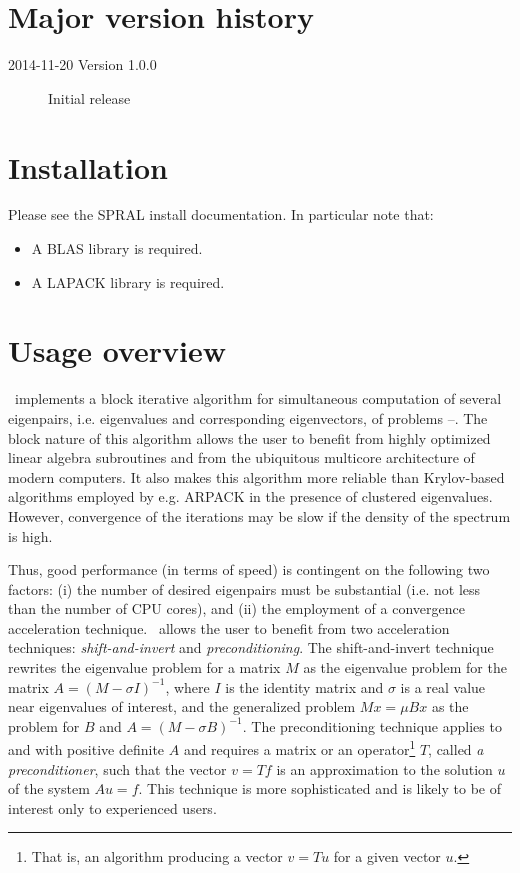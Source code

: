 \section*{Major version history}
\begin{description}
\item[2014-11-20 Version 1.0.0] Initial release
\end{description}


\section{Installation}
Please see the SPRAL install documentation. In particular note that:
\begin{itemize}
   \item A BLAS library is required.
   \item A LAPACK library is required.
\end{itemize}

\section{Usage overview}

\label{sec:summary}

\fullpackagename\
implements a block iterative algorithm
for simultaneous computation of several eigenpairs,
i.e. eigenvalues and corresponding eigenvectors,
of problems --.
The block nature of this algorithm allows the user
to benefit from highly optimized linear algebra subroutines
and from the ubiquitous multicore architecture
of modern computers.
It also makes this algorithm more reliable
than Krylov-based algorithms employed by e.g. ARPACK
in the presence of clustered eigenvalues.
However, convergence of the iterations may be slow
if the density of the spectrum is high.

Thus, good performance 
(in terms of speed)
is contingent on the following two factors:
(i) the number of desired
eigenpairs must be substantial
(i.e. not less than the number of CPU cores),
and
(ii) the employment of a convergence acceleration technique.
\fullpackagename\ allows the user to benefit
from two acceleration techniques:
{\em shift-and-invert} and {\em preconditioning}.
The shift-and-invert technique 
rewrites the eigenvalue problem for a matrix $M$ 
as the eigenvalue problem  for the matrix
$A = (M - \sigma I)^{-1}$,
where $I$ is the identity matrix
and $\sigma$ is a real value near eigenvalues of interest,
and the generalized problem $M x = \mu B x$
as the problem 
for $B$ and 
$A = (M - \sigma B)^{-1}$. 
The preconditioning technique applies to 
 and  with positive definite $A$ and
requires a matrix or an operator\footnote{
That is, an algorithm producing a vector $v = T u$ for a given
vector $u$.
}
$T$, called {\em a preconditioner},
such that the vector
$v = T f$ is an approximation to the solution $u$
of the system $A u = f$.
This technique is more sophisticated
and is likely to be of interest only to experienced users.


